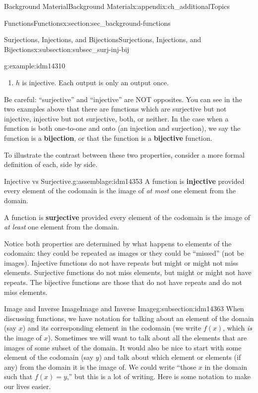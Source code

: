 \documentclass[oneside,10pt,]{book}
\newcommand{\terminology}[1]{\textbf{#1}}
\numberwithin{equation}{chapter}
\begin{document}
\begin{appendixptx}{Background Material}{}{Background Material}{}{}{x:appendix:ch_additionalTopics}
\begin{sectionptx}{Functions}{}{Functions}{}{}{x:section:sec_background-functions}
\begin{subsectionptx}{Surjections, Injections, and Bijections}{}{Surjections, Injections, and Bijections}{}{}{x:subsection:subsec_surj-inj-bij}
\begin{example}{}{g:example:idm14310}
\begin{enumerate}
\item{}\(h\) is injective. Each output is only an output once.%
\end{enumerate}
%
\end{example}
Be careful: ``surjective'' and ``injective'' are NOT opposites.  You can see in the two examples above that there are functions which are surjective but not injective, injective but not surjective, both, or neither. In the case when a function is both one-to-one and onto (an injection and surjection), we say the function is a \terminology{bijection}, or that the function is a \terminology{bijective} function.%
\par
To illustrate the contrast between these two properties, consider a more formal definition of each, side by side.%
\begin{assemblage}{Injective vs Surjective.}{g:assemblage:idm14353}%
A function is \terminology{injective} provided every element of the codomain is the image of \emph{at most} one element from the domain.%
\par
A function is \terminology{surjective} provided every element of the codomain is the image of \emph{at least} one element from the domain.%
\end{assemblage}
Notice both properties are determined by what happens to elements of the codomain: they could be repeated as images or they could be ``missed'' (not be images).  Injective functions do not have repeats but might or might not miss elements.  Surjective functions do not miss elements, but might or might not have repeats.  The bijective functions are those that do not have repeats and do not miss elements.%
\end{subsectionptx}
%
%
\typeout{************************************************}
\typeout{************************************************}
%
\begin{subsectionptx}{Image and Inverse Image}{}{Image and Inverse Image}{}{}{g:subsection:idm14363}
When discussing functions, we have notation for talking about an element of the domain (say \(x\)) and its corresponding element in the codomain (we write \(f(x)\), which \emph{is} the image of \(x\)). Sometimes we will want to talk about all the elements that are images of some subset of the domain.  It would also be nice to start with some element of the codomain (say \(y\)) and talk about which element or elements (if any) from the domain it is the image of. We could write ``those \(x\) in the domain such that \(f(x) = y\),'' but this is a lot of writing. Here is some notation to make our lives easier.%

\end{subsectionptx}
\end{sectionptx}
\end{appendixptx}
\end{document}
